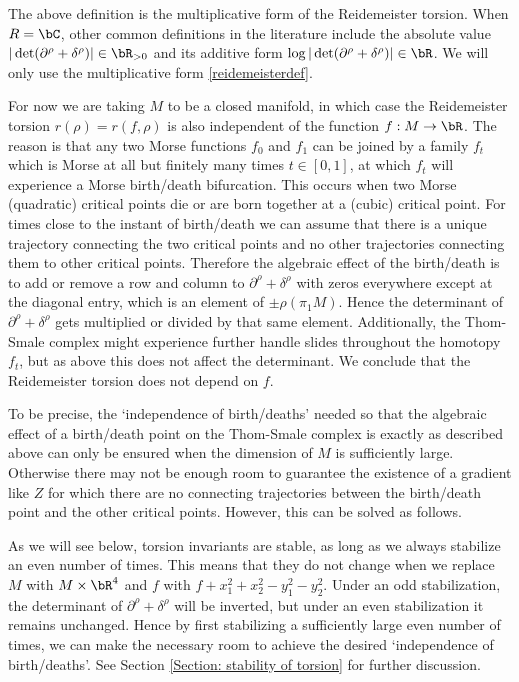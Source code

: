 \begin{remark}
The above definition is the multiplicative form of the Reidemeister torsion. When $R=\bC$, other common definitions in the literature include the absolute value $|\det(\partial^\rho+\delta^\rho)| \in \bR_{>0}$ and its additive form $\log |\det(\partial^\rho+\delta^\rho)| \in \bR$. We will only use the multiplicative form \ref{reidemeisterdef}.
\end{remark}

For now we are taking $M$ to be a closed manifold, in which case the Reidemeister torsion $r(\rho)=r(f, \rho)$ is also independent of the function $f:M \to \bR$. The reason is that any two Morse functions $f_0$ and $f_1$ can be joined by a family $f_t$ which is Morse at all but finitely many times $t \in [0,1]$, at which $f_t$ will experience a Morse birth/death bifurcation. This occurs when two Morse (quadratic) critical points die or are born together at a (cubic) critical point. For times close to the instant of birth/death we can assume that there is a unique trajectory connecting the two critical points and no other trajectories connecting them to other critical points. Therefore the algebraic effect of the birth/death is to add or remove a row and column to $\partial^\rho+\delta^\rho$ with zeros everywhere except at the diagonal entry, which is an element of $\pm \rho( \pi_1M)$. Hence the determinant of $\partial^\rho+\delta^\rho$ gets multiplied or divided by that same element. Additionally, the Thom-Smale complex might experience further handle slides throughout the homotopy $f_t$, but as above this does not affect the determinant. We conclude that the Reidemeister torsion does not depend on $f$.

To be precise, the `independence of birth/deaths' needed so that the algebraic effect of a birth/death point on the Thom-Smale complex is exactly as described above can only be ensured when the dimension of $M$ is sufficiently large. Otherwise there may not be enough room to guarantee the existence of a gradient like $Z$ for which there are no connecting trajectories between the birth/death point and the other critical points. However, this can be solved as follows.

As we will see below, torsion invariants are stable, as long as we always stabilize an even number of times. This means that they do not change when we replace $M$ with $M \times \bR^4$ and $f$ with $f +x_1^2+x_2^2 - y_1^2- y_2^2$. Under an odd stabilization, the determinant of $\partial^\rho+\delta^\rho$ will be inverted, but under an even stabilization it remains unchanged. Hence by first stabilizing a sufficiently large even number of times, we can make the necessary room to achieve the desired `independence of birth/deaths'. See Section \ref{Section: stability of torsion} for further discussion.

